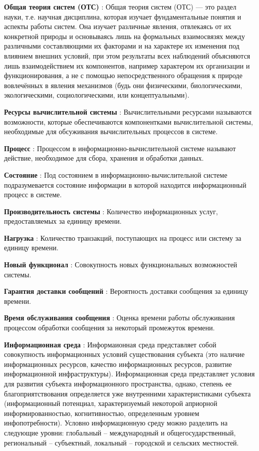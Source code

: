 \textbf{Общая теория систем (ОТС)} : Общая теория систем (ОТС) — это раздел науки, т.е. научная дисциплина, которая изучает фундаментальные понятия и аспекты работы систем. Она изучает различные явления, отвлекаясь от их конкретной природы и основываясь лишь на формальных взаимосвязях между различными составляющими их факторами и на характере их изменения под влиянием внешних условий, при этом результаты всех наблюдений объясняются лишь взаимодействием их компонентов, например характером их организации и функционирования, а не с помощью непосредственного обращения к природе вовлечённых в явления механизмов (будь они физическими, биологическими, экологическими, социологическими, или концептуальными).

\textbf{Ресурсы вычислительной системы} : Вычислительными ресурсами называются возможности, которые обеспечиваются компонентками вычислительной системы, необходимые для обсуживания вычислительных процессов в системе. 

\textbf{Процесс} : Процессом в информационно-вычислительной системе называют действие, необходимое для сбора, хранения и обработки данных.

\textbf{Состояние} : Под состоянием в информационно-вычислительной системе подразумевается состояние информации в которой находится информационный процесс в системе.

\textbf{Производительность системы} : Количество информационных услуг, предоставляемых за единицу времени.

\textbf{Нагрузка} : Количество транзакций, поступающих на процесс или систему за единицу времени.

\textbf{Новый функционал} : Совокупность новых функциональных возможностей системы.

\textbf{Гарантия доставки сообщений} : Вероятность доставки сообщения за единицу времени.

\textbf{Время обслуживания сообщения} : Оценка времени работы обслуживания процессом обработки сообщения за некоторый промежуток времени.

\textbf{Информационная среда} : Информаионная среда представляет собой совокупность информационных условий существования субъекта (это наличие информационных ресурсов, качество информационных ресурсов, развитие информационной инфраструктуры). Информационная среда представляет условия для развития субъекта информационного пространства, однако, степень ее благоприятствования определяется уже внутренними характеристиками субъекта (информационный потенциал, характеризуемый некоторой априорной информированностью, когнитивностью, определенным уровнем инфопотребности). Условно информационную среду можно разделить на следующие уровни: глобальный – международный и общегосударственный, региональный – субъектный, локальный – городской и сельских местностей.

